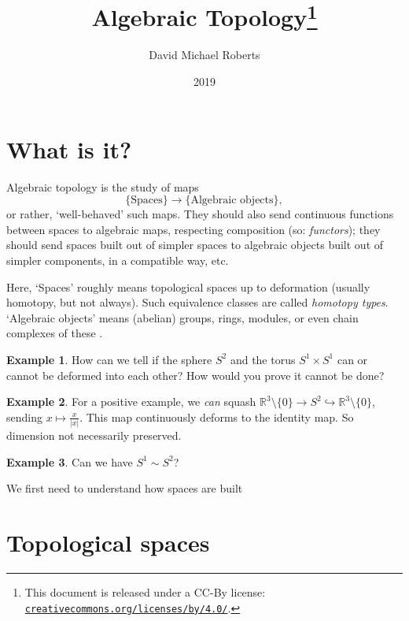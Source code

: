 \documentclass{tufte-handout}
\title{Algebraic Topology\thanks{This document is released under a CC-By license: 
\href{https://creativecommons.org/licenses/by/4.0/}{\texttt{creativecommons.org/licenses/by/4.0/}}.}
}
\author[D.M.~Roberts]{David Michael Roberts}
\date{2019}
\def\into {\hookrightarrow}
\def\RR{\mathbb{R}}
\newcommand{\lecturenum}[1]{\marginnote{\color{red}Lecture #1}}
\theoremstyle{definition}
\newtheorem{example}{Example}
\begin{document}
 

\maketitle


\section{What is it?}

\lecturenum{1}
Algebraic topology is the study of maps 
\[
	\{\text{Spaces}\} \longrightarrow \{\text{Algebraic objects}\},
\] 
%
or rather, `well-behaved' such maps. They should also send continuous functions between spaces to 
algebraic maps, respecting composition (so: \emph{functors}); they should send spaces built 
out of simpler spaces to algebraic objects built out of simpler components, in a compatible way, 
etc.

Here, `Spaces' roughly means topological spaces up to deformation (usually homotopy, but 
not always). Such equivalence classes are called \emph{homotopy types}. `Algebraic 
objects' means (abelian) groups, rings, modules, or even chain complexes of these 
.

\begin{example} 
	How can we tell if the sphere $S^2$ and the torus $S^1\times S^1$ can or 
	cannot be deformed into each other? How would you prove it cannot be done? 
\end{example}

\begin{example} 
	For a positive example, we \emph{can} squash $\RR^3 \setminus \{0\} \to S^2 \into 
	\RR^3 \setminus \{0\} $, sending $x\mapsto \frac{x}{|x|}$. This map continuously 
	deforms to the identity map. So dimension not necessarily preserved.
\end{example}

\begin{example} 
	Can we have $S^1 \sim S^2$? 
\end{example} 

\noindent We first need to understand how spaces are built

\section{Topological spaces}
\end{document}
